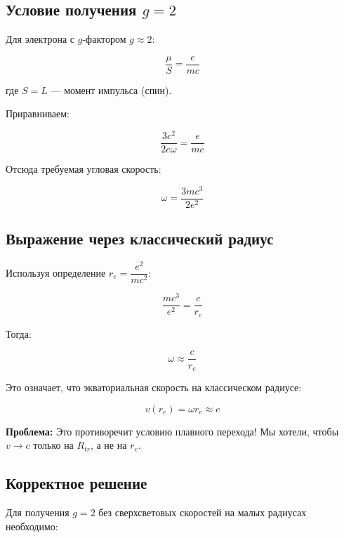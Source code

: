 \documentclass[12pt,a4paper]{article}
\begin{document}
\subsection{Условие получения $g = 2$}

Для электрона с $g$-фактором $g \approx 2$:

\begin{equation}
    \frac{\mu}{S} = \frac{e}{mc}
\end{equation}

где $S = L$ --- момент импульса (спин).

Приравниваем:

\begin{equation}
    \frac{3 c^2}{2 e \omega} = \frac{e}{mc}
\end{equation}

Отсюда требуемая угловая скорость:

\begin{equation}
    \omega = \frac{3 m c^3}{2 e^2}
\end{equation}

\subsection{Выражение через классический радиус}

Используя определение $r_e = \dfrac{e^2}{m c^2}$:

\begin{equation}
    \frac{m c^3}{e^2} = \frac{c}{r_e}
\end{equation}

Тогда:

\begin{equation}
    \omega \approx \frac{c}{r_e}
\end{equation}

Это означает, что экваториальная скорость на классическом радиусе:

\begin{equation}
    v(r_e) = \omega r_e \approx c
\end{equation}

\textbf{Проблема:} Это противоречит условию плавного перехода! Мы хотели, чтобы $v \to c$ только на $R_{tr}$, а не на $r_e$.

\subsection{Корректное решение}

Для получения $g=2$ без сверхсветовых скоростей на малых радиусах необходимо:
\end{document}

